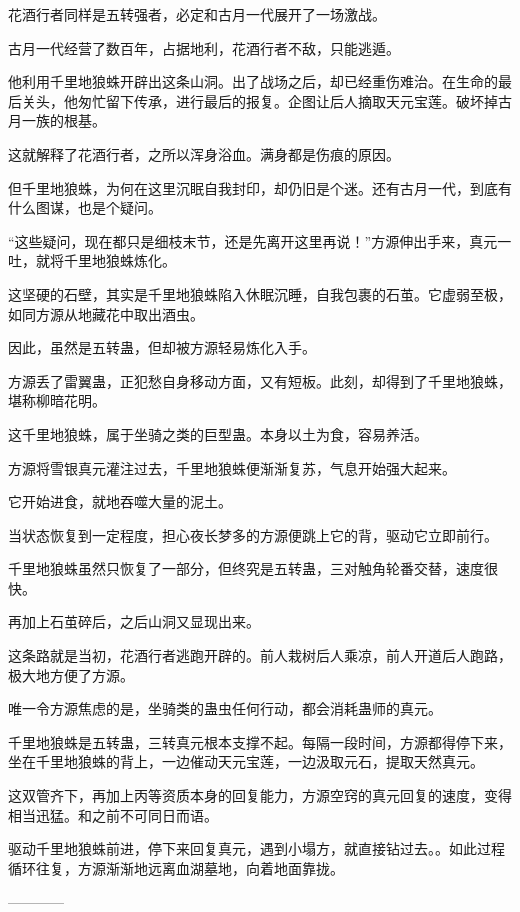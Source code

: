 \begin{this_body}
花酒行者同样是五转强者，必定和古月一代展开了一场激战。

古月一代经营了数百年，占据地利，花酒行者不敌，只能逃遁。

他利用千里地狼蛛开辟出这条山洞。出了战场之后，却已经重伤难治。在生命的最后关头，他匆忙留下传承，进行最后的报复。企图让后人摘取天元宝莲。破坏掉古月一族的根基。

这就解释了花酒行者，之所以浑身浴血。满身都是伤痕的原因。

但千里地狼蛛，为何在这里沉眠自我封印，却仍旧是个迷。还有古月一代，到底有什么图谋，也是个疑问。

“这些疑问，现在都只是细枝末节，还是先离开这里再说！”方源伸出手来，真元一吐，就将千里地狼蛛炼化。

这坚硬的石壁，其实是千里地狼蛛陷入休眠沉睡，自我包裹的石茧。它虚弱至极，如同方源从地藏花中取出酒虫。

因此，虽然是五转蛊，但却被方源轻易炼化入手。

方源丢了雷翼蛊，正犯愁自身移动方面，又有短板。此刻，却得到了千里地狼蛛，堪称柳暗花明。

这千里地狼蛛，属于坐骑之类的巨型蛊。本身以土为食，容易养活。

方源将雪银真元灌注过去，千里地狼蛛便渐渐复苏，气息开始强大起来。

它开始进食，就地吞噬大量的泥土。

当状态恢复到一定程度，担心夜长梦多的方源便跳上它的背，驱动它立即前行。

千里地狼蛛虽然只恢复了一部分，但终究是五转蛊，三对触角轮番交替，速度很快。

再加上石茧碎后，之后山洞又显现出来。

这条路就是当初，花酒行者逃跑开辟的。前人栽树后人乘凉，前人开道后人跑路，极大地方便了方源。

唯一令方源焦虑的是，坐骑类的蛊虫任何行动，都会消耗蛊师的真元。

千里地狼蛛是五转蛊，三转真元根本支撑不起。每隔一段时间，方源都得停下来，坐在千里地狼蛛的背上，一边催动天元宝莲，一边汲取元石，提取天然真元。

这双管齐下，再加上丙等资质本身的回复能力，方源空窍的真元回复的速度，变得相当迅猛。和之前不可同日而语。

驱动千里地狼蛛前进，停下来回复真元，遇到小塌方，就直接钻过去。。如此过程循环往复，方源渐渐地远离血湖墓地，向着地面靠拢。

------------

\end{this_body}

